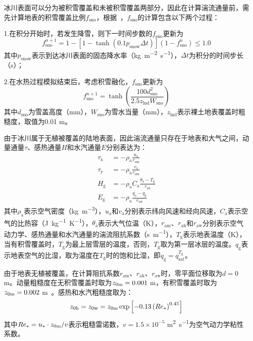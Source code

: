 冰川表面可以分为被积雪覆盖和未被积雪覆盖两部分，因此在计算湍流通量前，需先计算地表的积雪覆盖比例$f_{\mathrm{sno}}$，根据~\citet{swenson2012new}，$f_{\mathrm{sno}}$的计算包含以下两个过程：

1.在积分开始时，若发生降雪，则下一时间步数的$f_{\mathrm{sno}}$更新为
\begin{equation}
  f^{n+1}_{\mathrm{sno}}=1-\left[1-\tanh{\left(0.1 p_{\mathrm {snow}}  \Delta t\right)}\right]\left(1-f^n_{\mathrm{sno}}\right) \leqslant 1.0
\end{equation}
其中$p_{\mathrm {snow}} $表示到达冰川表面的固态降水率（\unit{kg.m^{-2}.s^{-1}}），$\Delta t$为积分的时间步长（s）；

2.在水热过程模拟结束后，考虑积雪融化，$f_{\mathrm{sno}}$更新为
\begin{equation}
  f^{n+1}_{\mathrm{sno}}=\tanh \left(\frac{100 d^2_{\mathrm{sno}}}{2.5z_{\mathrm {lnd}} W_{\mathrm{sno}}}\right)
\end{equation}
其中$d_{\mathrm{sno}}$为雪盖高度（mm），$W_{\mathrm{sno}}$为雪水当量（mm），$z_{\mathrm {lnd}}$表示裸土地表覆盖时粗糙度，取值为0.01 m。


由于冰川属于无植被覆盖的陆地表面，因此湍流通量只存在于地表和大气之间，动量通量$\tau$、感热通量$H$和水汽通量$E$分别表达为：
\begin{align}
  \tau_{\mathrm {x}}  &= -\rho_{\mathrm{a}} \frac{u_{\mathrm{a}}}{r_{\mathrm{am}}} \\
  \tau_{\mathrm {y}}  &= -\rho_{\mathrm{a}} \frac{v_{\mathrm{a}}}{r_{\mathrm{am}}} \\
  H_{\mathrm {g}}  &= -\rho_{\mathrm{a}} C_{\mathrm{a}} \frac{\theta_{\mathrm{a}}-T_{\mathrm {g}} }{r_{\mathrm{ah}}} \\
  E_{\mathrm {g}}  &= -\rho_{\mathrm{a}} \frac{q_{\mathrm{a}}-q_{\mathrm {g}} }{r_{\mathrm{aw}}}
\end{align}
其中$\rho_{\mathrm{a}}$表示空气密度（\unit{kg.m^{-3}}），$u_{\mathrm{a}}$和$v_{\mathrm{a}}$分别表示纬向风速和经向风速，$C_{\mathrm{a}}$表示空气的比热容（\unit{J.kg^{-1}.K^{-1}}），$\theta_{\mathrm{a}}$表示大气位温（K），$r_{\mathrm{am}}$、$r_{\mathrm{ah}}$和$r_{\mathrm{aw}}$分别表示空气动力学、感热通量和水汽通量的湍流阻抗系数（\unit{s.m^{-1}}），$T_{\mathrm {g}} $表示地表温度（K），当有积雪覆盖时，$T_{\mathrm {g}} $为最上层雪层的温度，否则，$T_{\mathrm {g}} $取为第一层冰层的温度。$q_{\mathrm {g}} $表示地表空气的比湿，取为温度在$T_{\mathrm {g}} $时的饱和比湿，即$q_{\mathrm {g}} =q^{T_{\mathrm {g}} }_{\mathrm{sat}}$。

由于地表无植被覆盖，在计算阻抗系数$r_{\mathrm{am}}$、$r_{\mathrm{ah}}$、$r_{\mathrm{aw}}$时，零平面位移取为$d=0$ m。动量粗糙度在无积雪覆盖时取为$z_{\rm 0m}=0.001$ m，有积雪覆盖时取为$z_{\rm 0m}=0.002$ m~\citep{brock_willis_sharp_2006}。感热和水汽粗糙度取为：
\begin{equation}z_{\rm 0h}=z_{\rm 0w}=z_{\rm 0m}\exp{\left[-0.13\left(Re_*\right)^{0.45}\right]}
\end{equation}
其中$Re_*=u_*\cdot z_{\rm 0m}/v$表示粗糙雷诺数，$v= 1.5 \times 10^{-5}$ \unit{m^2.s^{-1}}为空气动力学粘性系数。

